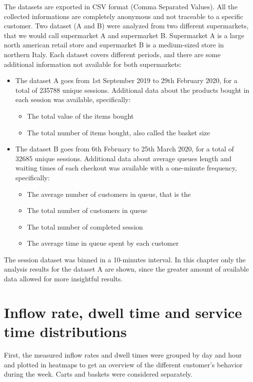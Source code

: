The datasets are exported in CSV format (Comma Separated Values). All the collected informations are completely anonymous and not traceable to a specific customer.
Two dataset (A and B) were analyzed from two different supermarkets, that we would call supermarket A and supermarket B. Supermarket A is a large north american retail store and supermarket B is a medium-sized store in northern Italy. Each dataset covers different periods, and there are some additional information not available for both supermarkets:
\begin{itemize}
  \item The dataset A goes from 1st September 2019 to 29th February 2020, for a total of 235788 unique sessions. Additional data about the products bought in each session was available, specifically:
        \begin{itemize}
          \item The total value of the items bought
          \item The total number of items bought, also called the basket size
        \end{itemize}

  \item The dataset B goes from  6th February to 25th March 2020, for a total of 32685 unique sessions. Additional data about average queues length and waiting times of each checkout was available with a one-minute frequency, specifically:
        \begin{itemize}
          \item The average number of customers in queue, that is the
          \item The total number of customers in queue
          \item The total number of completed session
          \item The average time in queue spent by each customer
        \end{itemize}
\end{itemize}
The session dataset was binned in a 10-minutes interval. In this chapter only the analysis results for the dataset A are shown, since the greater amount of available data allowed for more insightful results.

\section{Inflow rate, dwell time and service time distributions}
\label{sec:rates_distributions}
First, the measured inflow rates and dwell times were grouped by day and hour and plotted in heatmaps to get an overview of the different customer’s behavior during the week. Carts and baskets were considered separately.

